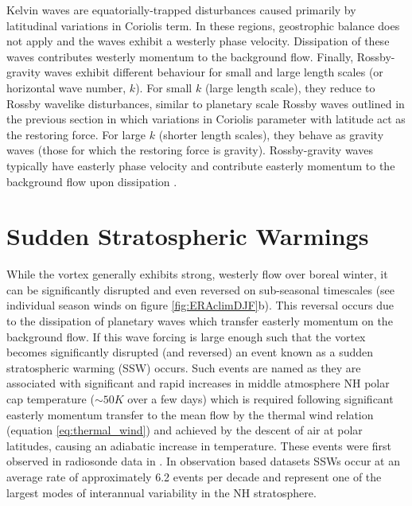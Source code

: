 Kelvin waves are equatorially-trapped disturbances caused primarily by latitudinal variations in Coriolis term. In these regions, geostrophic balance does not apply and the waves exhibit a westerly phase velocity. Dissipation of these waves contributes westerly momentum to the background flow. Finally, Rossby-gravity waves exhibit different behaviour for small and large length scales (or horizontal wave number, $k$). For small $k$ (large length scale), they reduce to Rossby wavelike disturbances, similar to planetary scale Rossby waves outlined in the previous section in which variations in Coriolis parameter with latitude act as the restoring force. For large $k$ (shorter length scales), they behave as gravity waves (those for which the restoring force is gravity). Rossby-gravity waves typically have easterly phase velocity and contribute easterly momentum to the background flow upon dissipation \citep{andrewsPlanetary1976}.

\section{Sudden Stratospheric Warmings}
\label{sec:SSWs}
While the vortex generally exhibits strong, westerly flow over boreal winter, it can be significantly disrupted and even reversed on sub-seasonal timescales
(see individual season winds on figure \ref{fig:ERAclimDJF}b). This reversal occurs due to the dissipation of planetary waves which transfer easterly momentum on the background flow. If this wave forcing is large enough such that the vortex becomes significantly disrupted (and reversed) an event known as a sudden stratospheric warming (SSW) occurs. Such events are named as they are associated with significant and rapid increases in middle atmosphere NH polar cap temperature ($\sim50K$ over a few days) which is required following significant easterly momentum transfer to the mean flow by the thermal wind relation (equation \ref{eq:thermal_wind}) and achieved by the descent of air at polar latitudes, causing an adiabatic increase in temperature. These events were first observed in radiosonde data in \cite{scherhagExplosionsartigen1952}. In observation based datasets SSWs occur at an average rate of approximately 6.2 events per decade \citep{butlerSudden2017} and represent one of the largest modes of interannual variability in the NH stratosphere.

